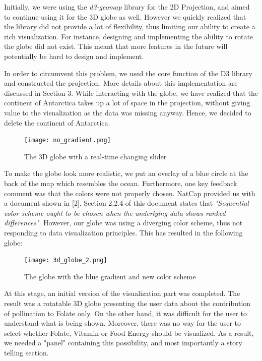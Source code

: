 \documentclass[12pt]{article}
\begin{document}
Initially, we were using the \textit{d3-geomap} library for the 2D Projection, and aimed to continue using it for the 3D globe as well. \newline
However we quickly realized that the library did not provide a lot of flexibility, thus limiting our ability to create a rich visualization. For instance, designing and implementing the ability to rotate the globe did not exist. This meant that more features in the future will potentially be hard to design and implement. \par

In order to circumvent this problem, we used the core function of the D3 library and constructed the projection. More details about this implementation are discussed in Section 3. \newline
While interacting with the globe, we have realized that the continent of Antarctica takes up a lot of space in the projection, without giving value to the visualization as the data was missing anyway. Hence, we decided to delete the continent of Antarctica. \newpage

\begin{figure}[h]
\centering
\texttt{[image: no\_gradient.png]}
\caption{The 3D globe with a real-time changing slider}
\end{figure} 

To make the globe look more realistic, we put an overlay of a blue circle at the back of the map which resembles the ocean. Furthermore, one key feedback comment was that the colors were not properly chosen. NatCap provided us with a document shown in [2]. Section 2.2.4 of this document states that \textit{"Sequential color scheme ought to be chosen when the underlying data shows ranked differences"}. However, our globe was using a diverging color scheme, thus not responding to data visualization principles. This has resulted in the following globe:
\begin{figure}[h]
\centering
\texttt{[image: 3d\_globe\_2.png]}
\caption{The globe with the blue gradient and new color scheme}
\end{figure} \newpage

At this stage, an initial version of the visualization part was completed. The result was a rotatable 3D globe presenting the user data about the contribution of pollination to Folate only. On the other hand, it was difficult for the user to understand what is being shown. Moreover, there was no way for the user to select whether Folate, Vitamin or Food Energy should be visualized. As a result, we needed a "panel" containing this possibility, and most importantly a story telling section.  
\end{document}
